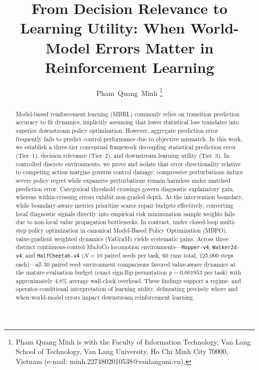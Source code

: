 \documentclass[journal,10pt,twocolumn]{IEEEtran}
\begin{document}
\title{From Decision Relevance to Learning Utility: When World-Model Errors Matter in Reinforcement Learning}

\author{Pham~Quang~Minh%
\thanks{Pham Quang Minh is with the Faculty of Information Technology, Van Lang School of Technology, Van Lang University, Ho Chi Minh City 70000, Vietnam (e-mail: minh.2274802010538@vanlanguni.vn).}%
}

\maketitle

\begin{abstract}
Model-based reinforcement learning (MBRL) commonly relies on transition prediction accuracy to fit dynamics, implicitly assuming that lower statistical loss translates into superior downstream policy optimization. However, aggregate prediction error frequently fails to predict control performance due to objective mismatch. In this work, we establish a three-tier conceptual framework decoupling statistical prediction error (Tier~1), decision relevance (Tier~2), and downstream learning utility (Tier~3). In controlled discrete environments, we prove and isolate that error directionality relative to competing action margins governs control damage: compressive perturbations induce severe policy regret while expansive perturbations remain harmless under matched prediction error. Categorical threshold crossings govern diagnostic explanatory gain, whereas within-crossing errors exhibit non-graded depth. At the intervention boundary, while boundary-aware metrics prioritize scarce repair budgets effectively, converting local diagnostic signals directly into empirical risk minimization sample weights fails due to non-local value propagation bottlenecks. In contrast, under closed-loop multi-step policy optimization in canonical Model-Based Policy Optimization (MBPO), value-gradient weighted dynamics (VaGraM) yields systematic gains. Across three distinct continuous-control MuJoCo locomotion environments---\texttt{Hopper-v4}, \texttt{Walker2d-v4}, and \texttt{HalfCheetah-v4} ($N=10$ paired seeds per task, 60 runs total, 125,000 steps each)---all 30 paired seed--environment comparisons favored value-aware dynamics at the mature evaluation budget (exact sign-flip permutation $p = 0.001953$ per task) with approximately 4.8\% average wall-clock overhead. These findings support a regime- and operator-conditional interpretation of learning utility, delineating precisely where and when world-model errors impact downstream reinforcement learning.
\end{abstract}
\end{document}
